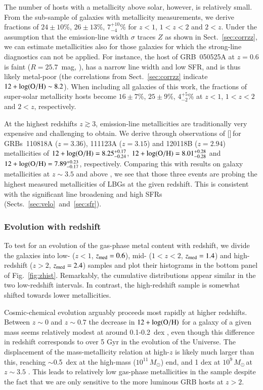 \documentclass[traditabstract, longauth]{aa}
\newcommand{\oh}{12+\log(\rm{O/H})}
\newcommand{\neiii}{[\ion{Ne}{iii}]}
\newcommand{\Msun}{$M_\odot$}
\begin{document}
{The number of hosts with a metallicity above solar, however, is relatively small. From the sub-sample of galaxies with metallicity measurements, we derive fractions of $24\pm 10$\%, $26\pm 13$\%, $7_{-4}^{+10}$\% for $z<1$, $1<z<2$ and $2<z$.  
Under the assumption that the emission-line width $\sigma$ traces $Z$ as shown in Sect.~\ref{sec:corrzz}, we can estimate metallicities also for those galaxies for which the strong-line diagnostics can not be applied. For instance, the host of GRB~050525A at $z=0.6$ is faint ($R=25.7$~mag, \citealp{2012ApJ...756..187H}), has a narrow line width and low SFR, and is thus likely metal-poor (the correlations from Sect.~\ref{sec:corrzz} indicate $\oh\sim8.2$). When including all galaxies of this work, the fractions of super-solar metallicity hosts become $16\pm7$\%, $25\pm9$\%, $4_{-2}^{+5}$\% at $z<1$, $1<z<2$ and $2<z$, respectively.}

At the highest redshifts $z\gtrsim3$, emission-line metallicities are traditionally very expensive and challenging to obtain. We derive through observations of \neiii\,for GRBs~110818A ($z=3.36$), 111123A ($z=3.15$) and 120118B ($z=2.94$) metallicities of $\oh=8.25_{-0.24}^{+0.17}$, $\oh=8.01_{-0.28}^{+0.28}$ and $\oh=7.89_{-0.17}^{+0.23}$, respectively. Comparing this with results on galaxy metallicities at $z\sim3.5$ and above \citep{2008A&A...488..463M, 2011ApJ...739....1L}, we see that those three events are probing the highest measured metallicities of LBGs at the given redshift. This is consistent with the significant line broadening and high SFRs (Sects.~\ref{sec:velo}~and~\ref{sec:sfr}).


\subsubsection{Evolution with redshift}

To test for an evolution of the gas-phase metal content with redshift, we divide the galaxies into low- ($z<1$, $z_{\rm{med}}=0.6$), mid- ($1<z<2$, $z_{\rm{med}}=1.4$) and high-redshift ($z>2$, $z_{\rm{med}} = 2.4$) samples and plot their histograms in the bottom panel of Fig.~\ref{fig:zhist}. Remarkably, the cumulative distributions appear similar in the two low-redshift intervals. In contrast, the high-redshift sample is somewhat shifted towards lower metallicities.

Cosmic-chemical evolution arguably proceeds most rapidly at higher redshifts. Between $z\sim0$ and $z\sim0.7$ the decrease in $\oh$ for a galaxy of a given mass seems relatively modest at around 0.1-0.2~dex \citep{2004ApJ...613..898T, 2005ApJ...635..260S}, even though this difference in redshift corresponds to over 5 Gyr in the evolution of the Universe. The displacement of the mass-metallicity relation at high-$z$ is likely much larger than this, reaching $\sim$0.5~dex at the high-mass ($10^{11}$\,\Msun) end, and 1 dex at $10^{9}$\,\Msun\,at $z\sim3.5$ \citep{2008A&A...488..463M, 2014A&A...563A..58T}. This leads to relatively low gas-phase metallicities in the sample despite the fact that we are only sensitive to the more luminous GRB hosts at $z>2$.
\end{document}
